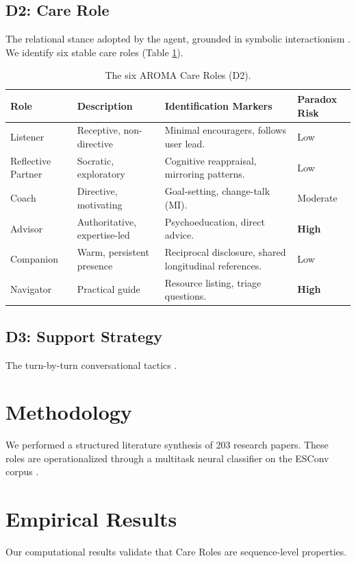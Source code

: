 \documentclass[11pt,a4paper]{article}
\begin{document}
\subsection{D2: Care Role}
The relational stance adopted by the agent, grounded in symbolic interactionism \cite{blumer1969symbolic}. We identify six stable care roles (Table \ref{tab:roles}).

\begin{table}[h!]
    \centering
    \small
    \begin{tabular}{lp{4cm}p{4cm}l}
    \toprule
    \textbf{Role} & \textbf{Description} & \textbf{Identification Markers} & \textbf{Paradox Risk} \\
    \midrule
    Listener & Receptive, non-directive & Minimal encouragers, follows user lead. & Low \\
    Reflective Partner & Socratic, exploratory & Cognitive reappraisal, mirroring patterns. & Low \\
    Coach & Directive, motivating & Goal-setting, change-talk (MI). & Moderate \\
    Advisor & Authoritative, expertise-led & Psychoeducation, direct advice. & \textbf{High} \\
    Companion & Warm, persistent presence & Reciprocal disclosure, shared longitudinal references. & Low \\
    Navigator & Practical guide & Resource listing, triage questions. & \textbf{High} \\
    \bottomrule
    \end{tabular}
    \caption{The six AROMA Care Roles (D2).}
    \label{tab:roles}
\end{table}

\subsection{D3: Support Strategy}
The turn-by-turn conversational tactics \cite{hill2009helping, liu2021towards}.

\section{Methodology}
We performed a structured literature synthesis \cite{nickerson2013taxonomy} of 203 research papers. These roles are operationalized through a multitask neural classifier on the ESConv corpus \cite{liu2021towards}.

\section{Empirical Results}
Our computational results validate that Care Roles are sequence-level properties.
\end{document}
